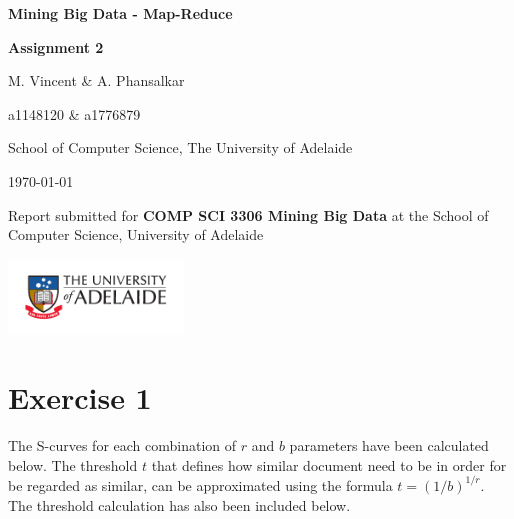 \documentclass[12t]{article}
\begin{document}
 	\newcommand{\titlestr}{Mining Big Data - Map-Reduce}
 	\newcommand{\shorttitlestr}{Assignment 2}
 	\newcommand{\groupnames}{M. Vincent \& A. Phansalkar}
 	\newcommand{\studentids}{a1148120 \& a1776879}
 	\newcommand{\authorstr}{\groupnames}
 	
 	\begin{titlepage}
 		\centering
 		
 		{\LARGE \bf \titlestr \par}
 		\vspace{0.25cm}
 		{\large \bf \shorttitlestr \par}
 		
 		
 		\vspace{1cm}
 		{\large \authorstr \\}
 		{ \studentids \par}
 		\vspace{0.25cm}
 		
 		\large School of Computer Science, The University of Adelaide
 		
 		\vspace{1cm}
 		\today
 		
 		\vspace{3cm}
 		Report submitted for
 		{\bf COMP SCI 3306 Mining Big Data}
 		at the School of Computer Science,
 		University of Adelaide
 		
 		\includegraphics[width=0.35\textwidth]{./Figures/UoA_logo_cmyk.pdf}
 		
 		\vspace{9cm}
 		

 	 	\vspace{1mm}
 		\noindent \hrulefill
 		
 		\vfill
 	\end{titlepage}
 	
 	\clearpage
 	\setcounter{page}{1}
	
	\section*{Exercise 1}

	The S-curves for each combination of $r$ and $b$ parameters have been calculated below. The threshold $t$ that defines how similar document need to be in order for be regarded as similar, can be approximated using the formula $t=(1/b)^{1/r}$. The threshold calculation has also been included below.
	
\end{document}
